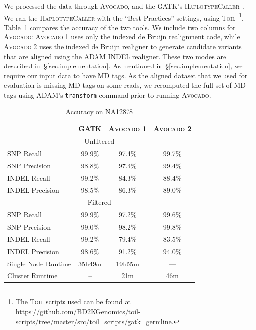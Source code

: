 \documentclass{bioinfo}
\begin{document}
We processed the data through \textsc{Avocado}, and the \textsc{GATK}'s
\textsc{HaplotypeCaller}~\citep{depristo11}. We ran the \textsc{HaplotypeCaller}
with the ``Best Practices'' settings, using
\textsc{Toil}~\citep{vivian16}\footnote{The \textsc{Toil} scripts used can be
found at \url{https://github.com/BD2KGenomics/toil-scripts/tree/master/src/toil_scripts/gatk_germline}.}.
Table~\ref{tab:accuracy} compares the accuracy of the two tools. We include two
columns for \textsc{Avocado}: \textsc{Avocado 1} uses only the indexed de Bruijn
realignment code, while \textsc{Avocado 2} uses the indexed de Bruijn realigner
to generate candidate variants that are aligned using the \textsc{ADAM} INDEL
realigner. These two modes are described in~\S\ref{sec:implementation}. As
mentioned in~\S\ref{sec:implementation}, we require our input data to have MD
tags. As the aligned dataset that we used for evaluation is missing MD tags on
some reads, we recomputed the full set of MD tags using \textsc{ADAM}'s
\texttt{transform} command prior to running \textsc{Avocado}.

\begin{table}[h]
\centering
\caption{Accuracy on NA12878}
\label{tab:accuracy}
\begin{tabular}{ l | c c c }
\hline
 & \bf \textsc{GATK} & \bf \textsc{Avocado 1} & \bf \textsc{Avocado 2}\\
\hline
\hline
\multicolumn{4}{c}{Unfiltered} \\
\hline
SNP Recall & 99.9\% & 97.4\% & 99.7\% \\
SNP Precision & 98.8\% & 97.3\% & 99.4\% \\
\hline
INDEL Recall & 99.2\% & 84.3\% & 88.4\% \\
INDEL Precision & 98.5\% & 86.3\% & 89.0\% \\
\hline
\multicolumn{4}{c}{Filtered} \\
\hline
SNP Recall & 99.9\% & 97.2\% & 99.6\% \\
SNP Precision & 99.0\% & 98.2\% & 99.8\% \\
\hline
INDEL Recall & 99.2\% & 79.4\% & 83.5\% \\
INDEL Precision & 98.6\% & 91.2\% & 94.0\% \\
\hline
Single Node Runtime & 35h49m & 19h55m & --- \\
Cluster Runtime & -- & 21m & 46m \\
\end{tabular}
\end{table}
\end{document}

